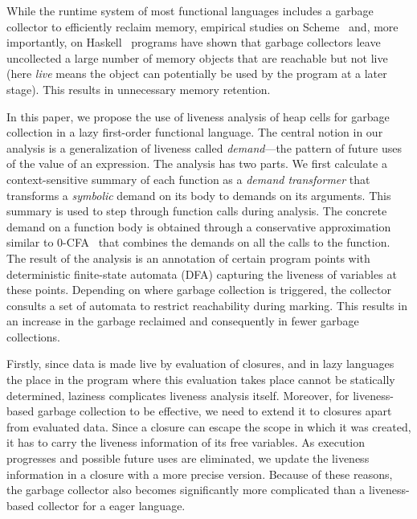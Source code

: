 \documentclass[9pt]{sigplanconf}
\newcommand{\added}[1]{{\color{Myblue}{#1}}}
\newcommand{\todelete}[1]{}%
\begin{document}
While  the runtime  system  of most  functional  languages includes  a
garbage collector to efficiently  reclaim memory, empirical studies on
Scheme~\cite{karkare06effectiveness}   and,   more   importantly,   on
Haskell~\cite{rojemo96lag} programs have shown that garbage collectors
leave uncollected a large number  of memory objects that are reachable
but not live (here {\em live} means the object can potentially be used
by the program at a  later stage).  This results in unnecessary memory
retention.

In this paper,  we propose the use of liveness  analysis of heap cells
for garbage collection in a lazy first-order functional language.  The
central notion in our analysis  is a generalization of liveness called
{\em  demand}---the  pattern  of  future  uses  of  the  value  of  an
expression.   The  analysis  has  two parts.   We  first  calculate  a
context-sensitive  summary   of  each   function  as  a   {\em  demand
  transformer} that transforms a {\em  symbolic} demand on its body to
demands  on its  arguments.   This  summary is  used  to step  through
function calls  during analysis.   The concrete  demand on  a function
body  is  obtained through  a  conservative  approximation similar  to
0-CFA~\cite{Shivers:1988} that  combines the demands on  all the calls
to  the function.   The result  of the  analysis is  an annotation  of
certain program points with  deterministic finite-state automata (DFA)
capturing the  liveness of  variables at  these points.   Depending on
where garbage collection is triggered, the collector consults a set of
automata to restrict reachability during  marking.  This results in an
increase in  the garbage reclaimed  and consequently in  fewer garbage
collections.

\todelete{While  this  idea has  been  shown  to  be effective  for  a
  first-order     {\em     eager}    language~\cite{asati14lgc},     a
  straightforward extension of the technique  is not possible for lazy
  languages,  where   heap-allocated  objects  may   include  closures
  (runtime   representations    of   unevaluated    expressions).    }
\added{Designing a liveness based garbage collector for lazy languages
  poses significant challenges.}  Firstly, since  data is made live by
evaluation of closures, and in lazy languages the place in the program
where  this evaluation  takes place  cannot be  statically determined,
laziness   complicates  liveness   analysis  itself.    Moreover,  for
liveness-based garbage collection  to be effective, we  need to extend
it to closures apart from evaluated  data.  Since a closure can escape
the  scope in  which it  was  created, it  has to  carry the  liveness
information  of  its  free  variables.  As  execution  progresses  and
possible  future   uses  are   eliminated,  we  update   the  liveness
information  in a  closure with  a more  precise version.   Because of
these reasons,  the garbage collector also  becomes significantly more
complicated than a liveness-based collector for a eager language.
\end{document}
